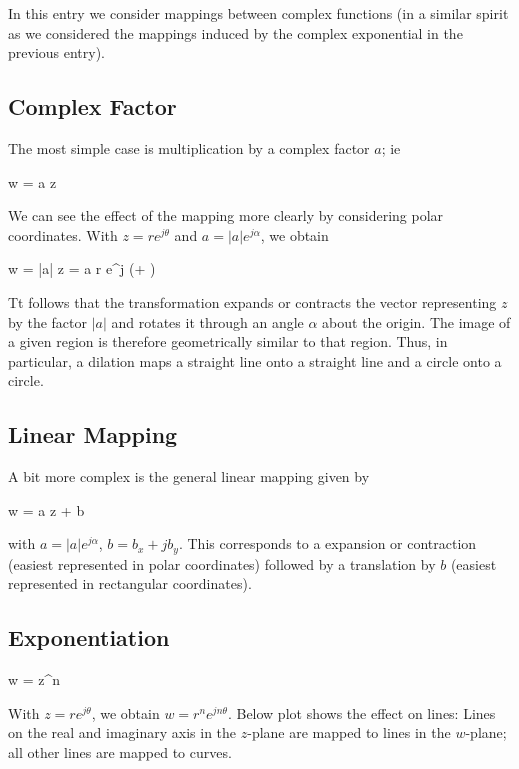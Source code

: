 
In this entry we consider mappings between complex functions (in a similar spirit as we considered the mappings induced by the complex exponential in the previous entry).


\subsection{Complex Factor}

The most simple case is multiplication by a complex factor $a$; ie

\bee
w = a \cdot z
\eee

We can see the effect of the mapping more clearly by considering polar coordinates. With $z = r e^{j \theta}$ and  $a = |a| e^{j \alpha}$, we obtain

\bee
w = |a| \cdot z = a r e^{j (\theta + \alpha)}
\eee

Tt follows that the transformation expands or contracts the vector representing $z$ by the factor $|a|$ and rotates it through an angle $\alpha$ about the origin. The image of a given region is therefore geometrically similar to that region. Thus, in particular, a dilation maps a straight line onto a straight line and a circle onto a circle.


\subsection{Linear Mapping}

A bit more complex is the general linear mapping given by

\bee
w = a \cdot z + b
\eee

with $a = |a| e^{j \alpha}$, $b = b_x + j b_y$. This corresponds to a expansion or contraction (easiest represented in polar coordinates) followed by a translation by $b$ (easiest represented in rectangular coordinates).

\subsection{Exponentiation}

\bee
w = z^n
\eee

With $z = r e^{j \theta}$, we obtain $w = r^n e^{j n \theta}$. Below plot shows the effect on lines: Lines on the real and imaginary axis in the $z$-plane are mapped to lines in the $w$-plane; all other lines are mapped to curves.

